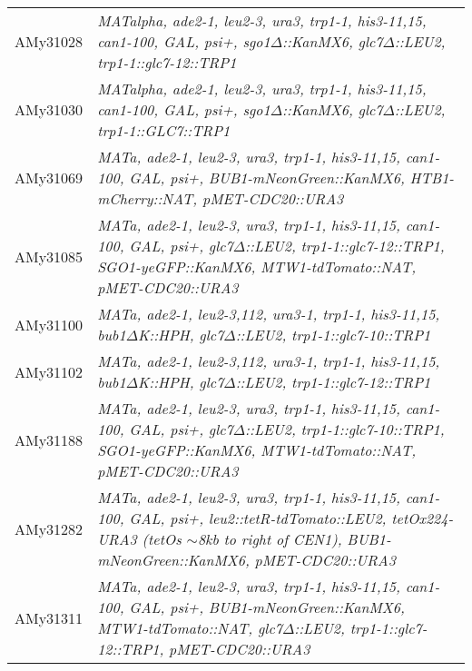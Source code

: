 \begin{longtable}{p{}p{}}
AMy31028        & \textit{MATalpha, ade2-1, leu2-3, ura3,   trp1-1, his3-11,15, can1-100, GAL, psi+, sgo1$\Delta$::KanMX6,  glc7$\Delta$::LEU2, trp1-1::glc7-12::TRP1}                                                                                                                 \\
AMy31030        & \textit{MATalpha, ade2-1, leu2-3, ura3,   trp1-1, his3-11,15, can1-100, GAL, psi+, sgo1$\Delta$::KanMX6, glc7$\Delta$::LEU2,   trp1-1::GLC7::TRP1}                                                                                                                   \\
AMy31069        & \textit{MATa, ade2-1, leu2-3, ura3,   trp1-1, his3-11,15, can1-100, GAL, psi+, BUB1-mNeonGreen::KanMX6,   HTB1-mCherry::NAT, pMET-CDC20::URA3}                                                                                                         \\
AMy31085        & \textit{MATa, ade2-1, leu2-3, ura3,   trp1-1, his3-11,15, can1-100, GAL, psi+, glc7$\Delta$::LEU2, trp1-1::glc7-12::TRP1,   SGO1-yeGFP::KanMX6, MTW1-tdTomato::NAT, pMET-CDC20::URA3}                                                                         \\
AMy31100        & \textit{MATa, ade2-1, leu2-3,112,   ura3-1, trp1-1, his3-11,15, bub1$\Delta$K::HPH, glc7$\Delta$::LEU2, trp1-1::glc7-10::TRP1}                                                                                                                                       \\
AMy31102        & \textit{MATa, ade2-1, leu2-3,112,   ura3-1, trp1-1, his3-11,15, bub1$\Delta$K::HPH, glc7$\Delta$::LEU2, trp1-1::glc7-12::TRP1}                                                                                                                                       \\
AMy31188        & \textit{MATa, ade2-1, leu2-3, ura3,   trp1-1, his3-11,15, can1-100, GAL, psi+, glc7$\Delta$::LEU2, trp1-1::glc7-10::TRP1,   SGO1-yeGFP::KanMX6, MTW1-tdTomato::NAT, pMET-CDC20::URA3}                                                                         \\
AMy31282        & \textit{MATa, ade2-1, leu2-3, ura3,   trp1-1, his3-11,15, can1-100, GAL, psi+, leu2::tetR-tdTomato::LEU2,   tetOx224-URA3 (tetOs $\sim$8kb to right of CEN1), BUB1-mNeonGreen::KanMX6,   pMET-CDC20::URA3}                                             \\
AMy31311        & \textit{MATa, ade2-1, leu2-3, ura3,   trp1-1, his3-11,15, can1-100, GAL, psi+, BUB1-mNeonGreen::KanMX6,   MTW1-tdTomato::NAT, glc7$\Delta$::LEU2, trp1-1::glc7-12::TRP1, pMET-CDC20::URA3}                                                                    \\

\end{longtable}
